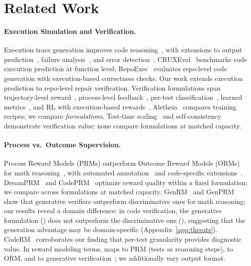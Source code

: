 \section{Related Work}
\label{sec:related_work}

\paragraph{Execution Simulation and Verification.}
Execution trace generation improves code reasoning~\cite{nye2021scratchpad}, with extensions to output prediction~\cite{meta2025cwm,maimon2026selfexecution,liu2024codemind,liu2023codeexecutor,lee2026solidcoder}, failure analysis~\cite{abdollahi2025demystifying}, and error detection~\cite{li2024redo}. CRUXEval~\citep{gu2024cruxeval} benchmarks code execution prediction at function level; RepoExec~\citep{nam2025repoexec} evaluates repo-level code generation with execution-based correctness checks. Our work extends execution prediction to repo-level repair verification. Verification formulations span trajectory-level reward~\cite{shum2025swerm}, process-level feedback~\cite{li2025codeprm,xu2025patchreasoner}, per-test classification~\cite{ni2023lever,chen2023codet}, learned metrics~\cite{zhuo2024icescore,dong2024codescore,zhou2023codebertscore}, and RL with execution-based rewards~\cite{wang2026verpo,tang2026execverify}. Aletheia~\cite{venkatkrishna2026aletheia} compares training recipes; we compare \emph{formulations}. Test-time scaling~\cite{snell2024scaling,li2025sstar,chen2025vgsearch} and self-consistency~\cite{wang2023selfconsistency} demonstrate verification value; none compare formulations at matched capacity.

\paragraph{Process vs.\ Outcome Supervision.}
Process Reward Models (PRMs) outperform Outcome Reward Models (ORMs) for math reasoning~\cite{lightman2023letsverify,uesato2022solving}, with automated annotation~\cite{wang2024mathshepherd,luo2024omegaprm} and code-specific extensions~\cite{ye2025prlcoder,zhang2026funprm,jiang2025coderlplus}. DreamPRM~\cite{dreamprm2025code} and CodePRM~\cite{li2025codeprm} optimize reward quality within a fixed formulation; we compare across formulations at matched capacity. GenRM~\cite{hosseini2025genrm} and GenPRM~\cite{zhao2026genprm} show that generative verifiers outperform discriminative ones for math reasoning; our results reveal a domain difference: in code verification, the generative formulation (\cwm{}) does not outperform the discriminative one (\cls{}), suggesting that the generation advantage may be domain-specific (Appendix~\ref{app:threats}). CodeRM~\cite{ma2025coderm} corroborates our finding that per-test granularity provides diagnostic value. In reward modeling terms, \cls{} maps to PRM (tests as reasoning steps), \traj{} to ORM, and \cwm{} to generative verification~\cite{hosseini2025genrm}; we additionally vary output format.

